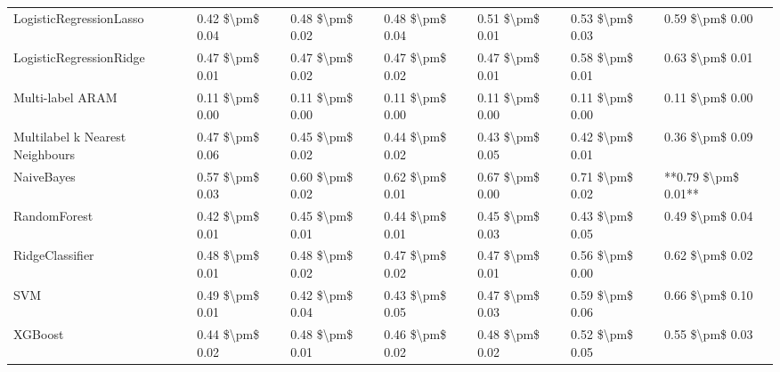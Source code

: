 \begin{tabular}{lllllll}
LogisticRegressionLasso         &  0.42 \$\textbackslash pm\$ 0.04 &           0.48 \$\textbackslash pm\$ 0.02 &       0.48 \$\textbackslash pm\$ 0.04 &        0.51 \$\textbackslash pm\$ 0.01 &                         0.53 \$\textbackslash pm\$ 0.03 &      0.59 \$\textbackslash pm\$ 0.00 \\
LogisticRegressionRidge         &  0.47 \$\textbackslash pm\$ 0.01 &           0.47 \$\textbackslash pm\$ 0.02 &       0.47 \$\textbackslash pm\$ 0.02 &        0.47 \$\textbackslash pm\$ 0.01 &                         0.58 \$\textbackslash pm\$ 0.01 &      0.63 \$\textbackslash pm\$ 0.01 \\
Multi-label ARAM                &  0.11 \$\textbackslash pm\$ 0.00 &           0.11 \$\textbackslash pm\$ 0.00 &       0.11 \$\textbackslash pm\$ 0.00 &        0.11 \$\textbackslash pm\$ 0.00 &                         0.11 \$\textbackslash pm\$ 0.00 &      0.11 \$\textbackslash pm\$ 0.00 \\
Multilabel k Nearest Neighbours &  0.47 \$\textbackslash pm\$ 0.06 &           0.45 \$\textbackslash pm\$ 0.02 &       0.44 \$\textbackslash pm\$ 0.02 &        0.43 \$\textbackslash pm\$ 0.05 &                         0.42 \$\textbackslash pm\$ 0.01 &      0.36 \$\textbackslash pm\$ 0.09 \\
NaiveBayes                      &  0.57 \$\textbackslash pm\$ 0.03 &           0.60 \$\textbackslash pm\$ 0.02 &       0.62 \$\textbackslash pm\$ 0.01 &        0.67 \$\textbackslash pm\$ 0.00 &                         0.71 \$\textbackslash pm\$ 0.02 &  **0.79 \$\textbackslash pm\$ 0.01** \\
RandomForest                    &  0.42 \$\textbackslash pm\$ 0.01 &           0.45 \$\textbackslash pm\$ 0.01 &       0.44 \$\textbackslash pm\$ 0.01 &        0.45 \$\textbackslash pm\$ 0.03 &                         0.43 \$\textbackslash pm\$ 0.05 &      0.49 \$\textbackslash pm\$ 0.04 \\
RidgeClassifier                 &  0.48 \$\textbackslash pm\$ 0.01 &           0.48 \$\textbackslash pm\$ 0.02 &       0.47 \$\textbackslash pm\$ 0.02 &        0.47 \$\textbackslash pm\$ 0.01 &                         0.56 \$\textbackslash pm\$ 0.00 &      0.62 \$\textbackslash pm\$ 0.02 \\
SVM                             &  0.49 \$\textbackslash pm\$ 0.01 &           0.42 \$\textbackslash pm\$ 0.04 &       0.43 \$\textbackslash pm\$ 0.05 &        0.47 \$\textbackslash pm\$ 0.03 &                         0.59 \$\textbackslash pm\$ 0.06 &      0.66 \$\textbackslash pm\$ 0.10 \\
XGBoost                         &  0.44 \$\textbackslash pm\$ 0.02 &           0.48 \$\textbackslash pm\$ 0.01 &       0.46 \$\textbackslash pm\$ 0.02 &        0.48 \$\textbackslash pm\$ 0.02 &                         0.52 \$\textbackslash pm\$ 0.05 &      0.55 \$\textbackslash pm\$ 0.03 \\
\bottomrule
\end{tabular}
